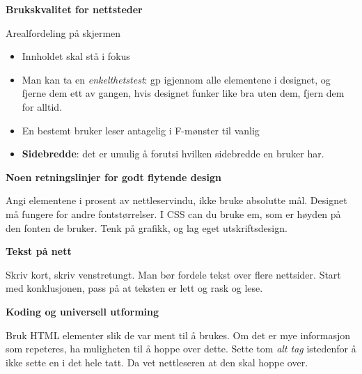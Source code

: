 \documentclass{article}
\begin{document}
\begin{flushleft}
\textbf{Brukskvalitet for nettsteder}
\bigskip

Arealfordeling på skjermen
\begin{itemize}
    \item Innholdet skal stå i fokus
    \item Man kan ta en \emph{enkelthetstest}: gp igjennom alle elementene i designet, og fjerne dem ett av gangen, hvis designet funker like bra uten dem, fjern dem for alltid. 
    \item En bestemt bruker leser antagelig i F-mønster til vanlig
    \item \textbf{Sidebredde}: det er umulig å forutsi hvilken sidebredde en bruker har. 
\end{itemize}
\textbf{Noen retningslinjer for godt flytende design}\par
Angi elementene i prosent av nettleservindu, ikke bruke absolutte mål. 
Designet må fungere for andre fontstørrelser. 
I CSS can du bruke em, som er høyden på den fonten de bruker.
Tenk på grafikk, og lag eget utskriftsdesign.
\par
\bigskip
\textbf{Tekst på nett}
\par
Skriv kort, skriv venstretungt. Man bør fordele tekst over flere nettsider. 
Start med konklusjonen, pass på at teksten er lett og rask og lese. 
\par
\bigskip
\textbf{Koding og universell utforming}
\par
Bruk HTML elementer slik de var ment til å brukes. 
Om det er mye informasjon som repeteres, ha muligheten til å hoppe over dette.
Sette tom \emph{alt tag} istedenfor å ikke sette en i det hele tatt. Da vet nettleseren at den skal hoppe over.





\end{flushleft}
\end{document}
